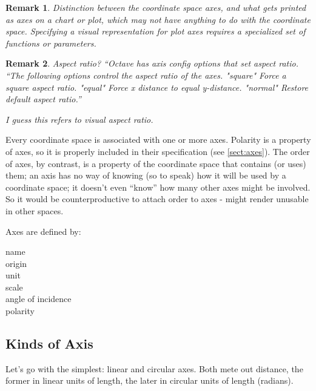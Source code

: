 \documentclass[12pt]{tufte-handout}
\numberwithin{equation}{subsection}
\numberwithin{equation}{subsection}
\newtheorem{remark}{Remark}
\newcommand\cspace{coordinate space}
\begin{document}
  \begin{remark}
    Distinction between the coordinate space axes, and what gets printed
    as axes on a chart or plot, which may not have anything to do with
    the coordinate space.  Specifying a visual representation for plot
    axes requires a specialized set of functions or parameters.
  \end{remark}

  \begin{remark}
    Aspect ratio?  ``Octave has axis config options that set aspect
    ratio.  ``The following options control the aspect ratio of the
    axes.  "square" Force a square aspect ratio.  "equal" Force x
    distance to equal y-distance.  "normal" Restore default aspect
    ratio.''

    I guess this refers to visual aspect ratio.
  \end{remark}

  Every \cspace{} is associated with one or more axes.  Polarity is a
  property of axes, so it is properly included in their specification
  (see \ref{sect:axes}).  The order of axes, by contrast, is a
  property of the \cspace{} that contains (or uses) them; an axis has
  no way of knowing (so to speak) how it will be used by a \cspace; it
  doesn't even ``know'' how many other axes might be involved.  So it
  would be counterproductive to attach order to axes - might render
  unusable in other spaces.

  Axes are defined by:

  \begin{description}
  \item [name]
  \item [origin]
  \item [unit]
  \item [scale]
  \item [angle of incidence]
  \item [polarity]
  \end{description}

  \subsection{Kinds of Axis}

  Let's go with the simplest: linear and circular axes.  Both mete
  out distance, the former in linear units of length, the later in
  circular units of length (radians).
\end{document}
